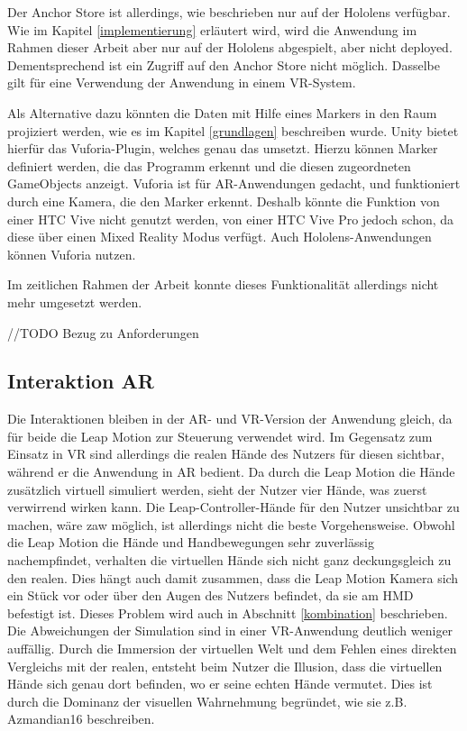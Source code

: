 Der Anchor Store ist allerdings, wie beschrieben nur auf der Hololens verfügbar. Wie im Kapitel \ref{implementierung} erläutert wird, wird die Anwendung im Rahmen dieser Arbeit aber nur auf der Hololens abgespielt, aber nicht deployed. Dementsprechend ist ein Zugriff auf den Anchor Store nicht möglich. Dasselbe gilt für eine Verwendung der Anwendung in einem VR-System.

Als Alternative dazu könnten die Daten mit Hilfe eines Markers in den Raum projiziert werden, wie es im Kapitel \ref{grundlagen} beschreiben wurde. Unity bietet hierfür das Vuforia-Plugin, welches genau das umsetzt. Hierzu können Marker definiert werden, die das Programm erkennt und die diesen zugeordneten GameObjects anzeigt. 
Vuforia ist für AR-Anwendungen gedacht, und funktioniert durch eine Kamera, die den Marker erkennt. Deshalb könnte die Funktion von einer HTC Vive nicht genutzt werden, von einer HTC Vive Pro jedoch schon, da diese über einen Mixed Reality Modus verfügt. Auch Hololens-Anwendungen können Vuforia nutzen. 

Im zeitlichen Rahmen der Arbeit konnte dieses Funktionalität allerdings nicht mehr umgesetzt werden.

//TODO 
Bezug zu Anforderungen

\subsection{Interaktion AR}

Die Interaktionen bleiben in der AR- und VR-Version der Anwendung gleich, da für beide die Leap Motion zur Steuerung verwendet wird.
Im Gegensatz zum Einsatz in VR sind allerdings die realen Hände des Nutzers für diesen sichtbar, während er die Anwendung in AR bedient. Da durch die Leap Motion die Hände zusätzlich virtuell simuliert werden, sieht der Nutzer vier Hände, was zuerst verwirrend wirken kann. 
Die Leap-Controller-Hände für den Nutzer unsichtbar zu machen, wäre zaw möglich, ist allerdings nicht die beste Vorgehensweise. Obwohl die Leap Motion die Hände und Handbewegungen sehr zuverlässig nachempfindet, verhalten die virtuellen Hände sich nicht ganz deckungsgleich zu den realen. Dies hängt auch damit zusammen, dass die Leap Motion Kamera sich ein Stück vor oder über den Augen des Nutzers befindet, da sie am HMD befestigt ist. Dieses Problem wird auch in Abschnitt \ref{kombination} beschrieben.
Die Abweichungen der Simulation sind in einer VR-Anwendung deutlich weniger auffällig. Durch die Immersion der virtuellen Welt und dem Fehlen eines direkten Vergleichs mit der realen, entsteht beim Nutzer die Illusion, dass die virtuellen Hände sich genau dort befinden, wo er seine echten Hände vermutet. Dies ist durch die Dominanz der visuellen Wahrnehmung begründet, wie sie z.B. Azmandian16 beschreiben.

